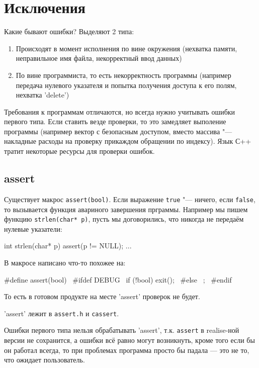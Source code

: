 \chapter{Исключения}


Какие бывают ошибки? Выделяют 2 типа:
\begin{enumerate}
\item
	Происходят в момент исполнения по вине окружения (нехватка памяти, неправильное имя файла, некорректный ввод данных)

\item
	По вине программиста, то есть некорректность программы (например передача нулевого указателя и
	попытка получения доступа к его полям, нехватка \cpp'delete')
\end{enumerate}

Требования к программам отличаются, но всегда нужно учитывать ошибки первого типа.
Если ставить везде проверки, то это замедляет выполение программы
(например вектор с безопасным доступом, вместо массива "--- накладные расходы на проверку прикаждом обращении по индексу).
Язык С++ тратит некоторые ресурсы для проверки ошибок.

\section{assert}

Существует макрос \verb'assert(bool)'. Если выражение \verb'true' "--- ничего, если \verb'false',
то вызывается функция авариного завершения прграммы.
Например мы пишем функцию \verb'strlen(char* p)', пусть мы договорились, что никогда не передаём нулевые указатели:
\begin{cppcode}
int strlen(char* p) {
	assert(p != NULL);
	...
}
\end{cppcode}

В макросе написано что-то похожее на:
\begin{cppcode}
#define assert(bool) \
#ifdef DEBUG \
if (!bool) exit(); \
#else \
; \
#endif
\end{cppcode}

То есть в готовом продукте на месте \cpp'assert' проверок не будет.
\begin{Rem}
	\cpp'assert' лежит в \verb'assert.h' и \verb'cassert'.
\end{Rem}

Ошибки первого типа нельзя обрабатывать \cpp'assert', т.к. \verb'assert' в realise-ной версии не сохранится,
а ошибки всё равно могут возникнуть, кроме того если бы он работал всегда,
то при проблемах программа просто бы падала --- это не то, что ожидает пользователь.

